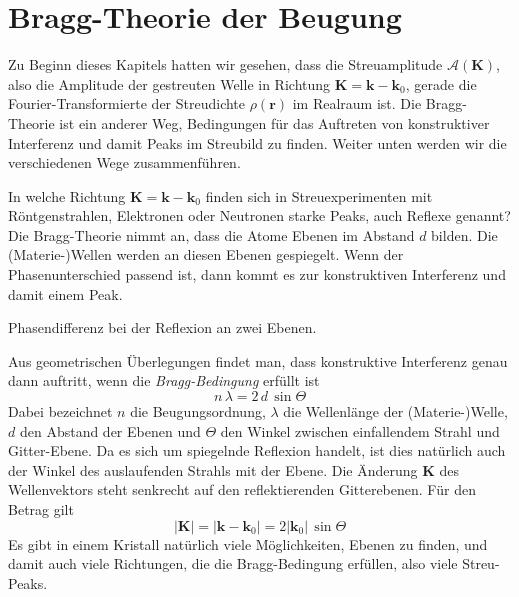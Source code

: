 \section{Bragg-Theorie der Beugung}

Zu Beginn dieses Kapitels hatten wir gesehen, dass die Streuamplitude $\mathcal{A}(\mathbf{K})$, also die Amplitude der gestreuten Welle in Richtung $\mathbf{K} = \mathbf{k} - \mathbf{k}_0$, gerade die Fourier-Transformierte der Streudichte $\rho(\mathbf{r})$ im Realraum ist. Die Bragg-Theorie ist ein anderer Weg, Bedingungen für das Auftreten von konstruktiver Interferenz und damit Peaks im Streubild zu finden. Weiter unten werden wir die verschiedenen Wege zusammenführen.

In welche Richtung $\mathbf{K} = \mathbf{k} - \mathbf{k}_0$ finden sich in Streuexperimenten mit Röntgenstrahlen, Elektronen oder Neutronen starke Peaks, auch Reflexe genannt? Die Bragg-Theorie nimmt an, dass die Atome Ebenen im Abstand $d$ bilden. Die (Materie-)Wellen werden an diesen Ebenen gespiegelt. Wenn der Phasenunterschied passend ist, dann kommt es zur konstruktiven Interferenz und damit einem Peak.


\begin{marginfigure}

\caption{Phasendifferenz bei der Reflexion an zwei Ebenen.}
\end{marginfigure}


Aus geometrischen Überlegungen findet man, dass konstruktive Interferenz genau dann auftritt, wenn die \emph{Bragg-Bedingung} erfüllt ist
\begin{equation}
n \, \lambda = 2 \, d \, \sin \Theta
\end{equation}
Dabei bezeichnet $n$ die Beugungsordnung, $\lambda$ die Wellenlänge der (Materie-)Welle, $d$ den Abstand der Ebenen und $\Theta$ den Winkel zwischen einfallendem Strahl und Gitter-Ebene. Da es sich um spiegelnde Reflexion handelt, ist dies natürlich auch der Winkel des auslaufenden Strahls mit der Ebene. Die Änderung 
$\mathbf{K}$ des Wellenvektors  steht senkrecht auf den reflektierenden Gitterebenen. Für den  Betrag gilt
\begin{equation}
|\mathbf{K}| = |\mathbf{k} - \mathbf{k}_0| = 2 | \mathbf{k}_0| \, \sin \Theta
\label{eq:rezi_def_k_sin_theta}
\end{equation}
Es gibt in einem Kristall natürlich viele Möglichkeiten, Ebenen zu finden, und damit auch viele Richtungen, die die Bragg-Bedingung erfüllen, also viele Streu-Peaks.
 
